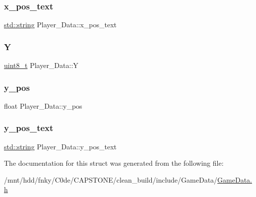 \mbox{\label{structPlayer__Data_ad8adb6d31cdad282cd24467e057ed52c}} 
\subsubsection{\texorpdfstring{x\+\_\+pos\+\_\+text}{x\_pos\_text}}
{\footnotesize\ttfamily \hyperlink{imgui__impl__opengl3__loader_8h_ac83513893df92266f79a515488701770}{std\+::string} Player\+\_\+\+Data\+::x\+\_\+pos\+\_\+text}

\mbox{\label{structPlayer__Data_a108903fa42b0b7dcc6fd34424018377e}} 
\subsubsection{\texorpdfstring{Y}{Y}}
{\footnotesize\ttfamily \hyperlink{stdint_8h_aba7bc1797add20fe3efdf37ced1182c5}{uint8\+\_\+t} Player\+\_\+\+Data\+::Y}

\mbox{\label{structPlayer__Data_a884e62bee1bfe66d7ea3998282190543}} 
\subsubsection{\texorpdfstring{y\+\_\+pos}{y\_pos}}
{\footnotesize\ttfamily float Player\+\_\+\+Data\+::y\+\_\+pos}

\mbox{\label{structPlayer__Data_a2365eeec519f45b9c3d3b88ec905949c}} 
\subsubsection{\texorpdfstring{y\+\_\+pos\+\_\+text}{y\_pos\_text}}
{\footnotesize\ttfamily \hyperlink{imgui__impl__opengl3__loader_8h_ac83513893df92266f79a515488701770}{std\+::string} Player\+\_\+\+Data\+::y\+\_\+pos\+\_\+text}



The documentation for this struct was generated from the following file\+:\begin{DoxyCompactItemize}
\item 
/mnt/hdd/fnky/\+C0de/\+C\+A\+P\+S\+T\+O\+N\+E/clean\+\_\+build/include/\+Game\+Data/\hyperlink{GameData_8h}{Game\+Data.\+h}\end{DoxyCompactItemize}
